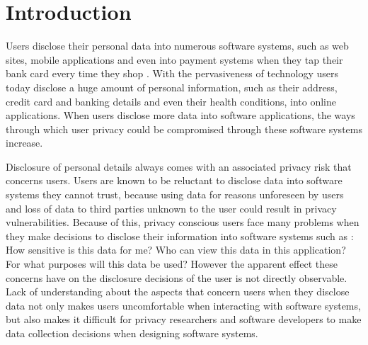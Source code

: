 \documentclass[conference]{IEEEtran}
\begin{document}
\maketitle


\begin{abstract}


\end{abstract}


%
\IEEEpeerreviewmaketitle

\section{Introduction}
Users disclose their personal data into numerous software systems, such as web sites, mobile applications and even into payment systems when they tap their bank card every time they shop \cite {federal2007fair}. With the pervasiveness of technology users today disclose a huge amount of personal information, such as their address, credit card and banking details and even their health conditions, into online applications. When users disclose more data into software applications, the ways through which user privacy could be compromised through these software systems increase. 

Disclosure of personal details always comes with an associated privacy risk that concerns users. Users are known to be reluctant to disclose data into software systems they cannot trust, because using data for reasons unforeseen by users and loss of data to third parties unknown to the user could result in privacy vulnerabilities. Because of this, privacy conscious users face many problems when they make decisions to disclose their information into software systems such as : How sensitive is this data for me? Who can view this data in this application? For what purposes will this data be used? However the apparent effect these concerns have on the disclosure decisions of the user is not directly observable. Lack of understanding about the aspects that concern users when they disclose data not only makes users uncomfortable when interacting with software systems, but also makes it difficult for privacy researchers and software developers to make data collection decisions when designing  software systems. 
\end{document}
